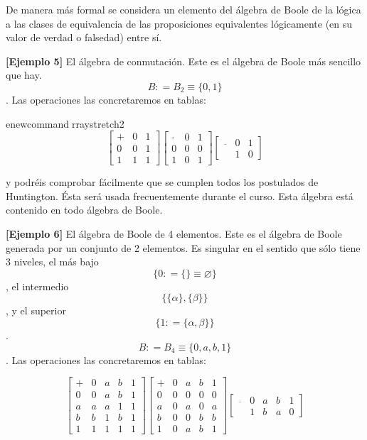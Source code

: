   De manera más formal se considera un elemento del álgebra de Boole de
  la lógica a las clases de equivalencia de las proposiciones
  equivalentes lógicamente (en su valor de verdad o falsedad) entre sí.

  \textbf{{[}Ejemplo 5{]}} El álgebra de conmutación. Este es el álgebra
  de Boole más sencillo que hay. \[B{{: = B_{2}} \equiv {\{{0,1}\}}}\].
  Las operaciones las concretaremos en tablas:

  \setcounter{MaxMatrixCols}{20}
  \setlength{\arraycolsep}{8pt} %
  
enewcommand{rraystretch}{2}
  \[\begin{bmatrix}
   + & 0 & 1 \\
  0 & 0 & 1 \\
  1 & 1 & 1
  \end{bmatrix}\begin{bmatrix}
   \cdot & 0 & 1 \\
  0 & 0 & 0 \\
  1 & 0 & 1
  \end{bmatrix}\begin{bmatrix}
  \overline{} & 0 & 1 \\
   & 1 & 0
  \end{bmatrix}\]

  y podréis comprobar fácilmente que se cumplen todos los postulados de
  Huntington. Ésta será usada frecuentemente durante el curso. Esta
  álgebra está contenido en todo álgebra de Boole.

  \textbf{{[}Ejemplo 6{]}} El álgebra de Boole de 4 elementos. Este es
  el álgebra de Boole generada por un conjunto de 2 elementos. Es
  singular en el sentido que sólo tiene 3 niveles, el más bajo
  \[\{{0{{: = {\{\}}} \equiv \varnothing}}\}\], el intermedio
  \[\{{{\{\alpha\}},{\{\beta\}}}\}\], y el superior
  \[\{{1{: = {\{{\alpha,\beta}\}}}}\}\].
  \[B{{: = B_{4}} \equiv {\{{0,a,b,1}\}}}\]. Las operaciones las
  concretaremos en tablas:

  \[\begin{bmatrix}
   + & 0 & a & b & 1 \\
  0 & 0 & a & b & 1 \\
  a & a & a & 1 & 1 \\
  b & b & 1 & b & 1 \\
  1 & 1 & 1 & 1 & 1
  \end{bmatrix}\begin{bmatrix}
   + & 0 & a & b & 1 \\
  0 & 0 & 0 & 0 & 0 \\
  a & 0 & a & 0 & a \\
  b & 0 & 0 & b & b \\
  1 & 0 & a & b & 1
  \end{bmatrix}\begin{bmatrix}
  \overline{} & 0 & a & b & 1 \\
   & 1 & b & a & 0
  \end{bmatrix}\]

